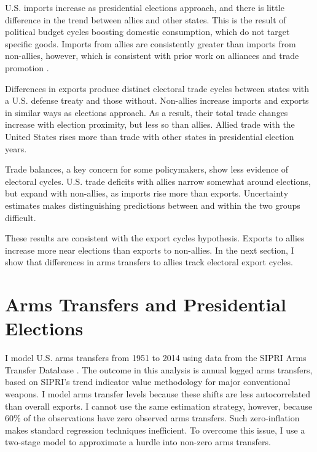 \documentclass[12pt]{article}
\begin{document}
U.S. imports increase as presidential elections approach, and there is little difference in the trend between allies and other states. 
This is the result of political budget cycles boosting domestic consumption, which do not target specific goods.
Imports from allies are consistently greater than imports from non-allies, however, which is consistent with prior work on alliances and trade promotion \citep{GowaMansfield2004}. 


Differences in exports produce distinct electoral trade cycles between states with a U.S. defense treaty and those without. 
Non-allies increase imports and exports in similar ways as elections approach. 
As a result, their total trade changes increase with election proximity, but less so than allies. 
Allied trade with the United States rises more than trade with other states in presidential election years. 


Trade balances, a key concern for some policymakers, show less evidence of electoral cycles. 
U.S. trade deficits with allies narrow somewhat around elections, but expand with non-allies, as imports rise more than exports. 
Uncertainty estimates makes distinguishing predictions between and within the two groups difficult.


These results are consistent with the export cycles hypothesis. 
Exports to allies increase more near elections than exports to non-allies.
In the next section, I show that differences in arms transfers to allies track electoral export cycles.



\section{Arms Transfers and Presidential Elections}


I model U.S. arms transfers from 1951 to 2014 using data from the SIPRI Arms Transfer Database \citep{SIPRI2021}.
The outcome in this analysis is annual logged arms transfers, based on SIPRI's trend indicator value methodology for major conventional weapons.
I model arms transfer levels because these shifts are less autocorrelated than overall exports.
I cannot use the same estimation strategy, however, because 60\% of the observations have zero observed arms transfers.
Such zero-inflation makes standard regression techniques inefficient.
To overcome this issue, I use a two-stage model to approximate a hurdle into non-zero arms transfers. 
\end{document}
